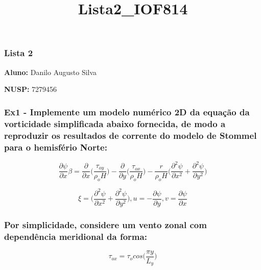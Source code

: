 \documentclass[11pt]{article}
\title{Lista2\_IOF814}
\begin{document}
    
    
    \maketitle
    
    

    
    \subsubsection{Lista 2}\label{lista-2}

\textbf{Aluno:} Danilo Augusto Silva

\textbf{NUSP:} 7279456

    \subsubsection{Ex1 - Implemente um modelo numérico 2D da equação da
vorticidade simplificada abaixo fornecida, de modo a reproduzir os
resultados de corrente do modelo de Stommel para o hemisfério
Norte:}\label{ex1---implemente-um-modelo-numuxe9rico-2d-da-equauxe7uxe3o-da-vorticidade-simplificada-abaixo-fornecida-de-modo-a-reproduzir-os-resultados-de-corrente-do-modelo-de-stommel-para-o-hemisfuxe9rio-norte}

\begin{equation}
    \frac{\partial{\psi}}{\partial{x}}\beta = \frac{\partial}{\partial{x}}\bigg( \frac{\tau_{oy}}{\rho_oH} \bigg)- \frac{\partial}{\partial{y}}\bigg(\frac{\tau_{ox}}{\rho_oH} \bigg) - \frac{r}{\rho_oH}\bigg( \frac{\partial^2{\psi}}{\partial{x^2}} + \frac{\partial^2{\psi}}{\partial{y^2}} \bigg)
    \label{ex1:1}
\end{equation}

\begin{equation}
    \xi = \bigg( \frac{\partial^2{\psi}}{\partial{x^2}} + \frac{\partial^2{\psi}}{\partial{y^2}} \bigg), u = - \frac{\partial{\psi}}{\partial{y}}, v = \frac{\partial{\psi}}{\partial{x}}
    \label{ex1:2}
\end{equation}

\subsubsection{Por simplicidade, considere um vento zonal com
dependência meridional da
forma:}\label{por-simplicidade-considere-um-vento-zonal-com-dependuxeancia-meridional-da-forma}

\begin{equation}
    \tau_{ox} = \tau_o cos\bigg( \frac{\pi y}{L_y} \bigg)
    \label{ex1:3}
\end{equation}
\end{document}
